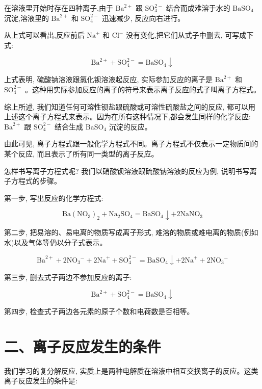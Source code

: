 \documentclass[10pt]{article}
\begin{document}
在溶液里开始时存在四种离子,由于 \({\mathrm{{Ba}}}^{2 + }\) 跟 \({\mathrm{{SO}}}_{4}^{2 - }\) 结合而成难溶于水的 \({\mathrm{{BaSO}}}_{4}\) 沉淀,溶液里的 \({\mathrm{{Ba}}}^{2 + }\) 和 \({\mathrm{{SO}}}_{4}^{2 - }\) 迅速减少, 反应向右进行。

从上式可以看出,反应前后 \({\mathrm{{Na}}}^{ + }\) 和 \({\mathrm{{Cl}}}^{ - }\) 没有变化,把它们从式子中删去, 可写成下式:

\[
{\mathrm{{Ba}}}^{2 + } + {\mathrm{{SO}}}_{4}^{2 - } = {\mathrm{{BaSO}}}_{4} \downarrow
\]

上式表明, 硫酸钠溶液跟氯化钡溶液起反应, 实际参加反应的离子是 \({\mathrm{{Ba}}}^{2 + }\) 和 \({\mathrm{{SO}}}_{4}^{2 - }\) 。这种用实际参加反应的离子的符号来表示离子反应的式子叫离子方程式。

综上所述, 我们知道任何可溶性钡盐跟硫酸或可溶性硫酸盐之间的反应, 都可以用上述这个离子方程式来表示。因为在所有这种情况下,都会发生同样的化学反应: \({\mathrm{{Ba}}}^{2 + }\) 跟 \({\mathrm{{SO}}}_{4}^{2 - }\) 结合生成 \({\mathrm{{BaSO}}}_{4}\) 沉淀的反应。

由此可见, 离子方程式跟一般化学方程式不同。离子方程式不仅表示一定物质间的某个反应, 而且表示了所有同一类型的离子反应。

怎样书写离子方程式呢? 我们以硝酸钡溶液跟硫酸钠溶液的反应为例, 说明书写离子方程式的步骤。

第一步, 写出反应的化学方程式:

\[
\mathrm{{Ba}}{\left( {\mathrm{{NO}}}_{3}\right) }_{2} + {\mathrm{{Na}}}_{2}{\mathrm{{SO}}}_{4} = {\mathrm{{BaSO}}}_{4} \downarrow + 2{\mathrm{{NaNO}}}_{3}
\]

第二步, 把易溶的、易电离的物质写成离子形式, 难溶的物质或难电离的物质(例如水)以及气体等仍以分子式表示。

\[
{\mathrm{{Ba}}}^{2 + } + 2{\mathrm{{NO}}}_{3}{}^{ - } + 2{\mathrm{{Na}}}^{ + } + {\mathrm{{SO}}}_{4}^{2 - } = {\mathrm{{BaSO}}}_{4} \downarrow + 2{\mathrm{{Na}}}^{ + } + 2{\mathrm{{NO}}}_{3}{}^{ - }
\]

第三步, 删去式子两边不参加反应的离子:

\[
{\mathrm{{Ba}}}^{2 + } + {\mathrm{{SO}}}_{4}^{2 - } = {\mathrm{{BaSO}}}_{4} \downarrow
\]

第四步, 检查式子两边各元素的原子个数和电荷数是否相等。

\section*{二、离子反应发生的条件}

我们学习的复分解反应, 实质上是两种电解质在溶液中相互交换离子的反应。这类离子反应发生的条件是:
\end{document}
